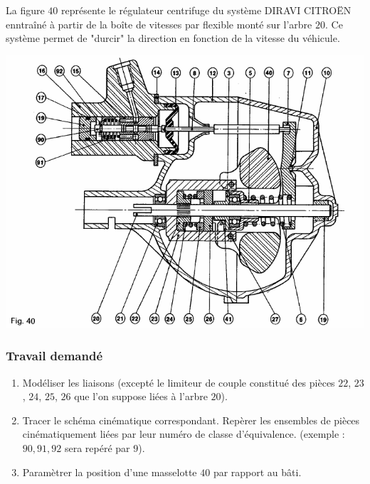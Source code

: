 

La figure $40$ représente le régulateur centrifuge du système DIRAVI CITROËN enntraîné à partir de la boîte de vitesses par flexible monté sur l'arbre $20$. Ce système permet de "durcir" la direction en fonction de la vitesse du véhicule.
\begin{center}
    \includegraphics[scale=0.7]{png/citroen.png}
\end{center}

\subsubsection{Travail demandé}
\begin{enumerate}
\item Modéliser les liaisons (excepté le limiteur de couple constitué des pièces $22$, $23$, $24$, $25$, $26$ que l'on suppose liées à l'arbre $20$).
\item Tracer le schéma cinématique correspondant. Repèrer les ensembles de pièces cinématiquement liées par  leur numéro de classe d'équivalence. (exemple : ${90, 91, 92}$ sera repéré par $9$).
\item Paramètrer la position d'une masselotte $40$ par rapport au bâti.
\end{enumerate}
\newpage



